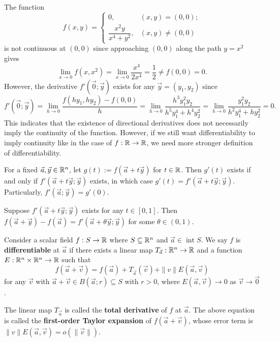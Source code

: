 \documentclass[a4paper]{ctexart}
\begin{document}
    \begin{myex}
        The function
        $$ f(x,y) = \begin{cases}
            0, & (x,y) = (0,0); \\[6pt]
            \dfrac{x^2 y}{x^4 + y^2}, & (x,y) \ne (0,0)
        \end{cases}
        $$
        is not continuous at $(0,0)$ since approaching $(0,0)$ along the path $y=x^2$ gives
        $$ \lim_{x\to 0} f(x,x^2) = \lim_{x\to 0} \frac{x^4}{2x^4} = \frac{1}{2} \ne f(0,0) = 0. $$
        However, the derivative $f'(\vec 0; \vec y)$ exists for any $\vec y = (y_1, y_2)$ since
        $$ f'(\vec 0; \vec y) = \lim_{h\to 0} \frac{f(h y_1, h y_2) - f(0,0)}{h} = \lim_{h\to 0} \frac{h^3 y_1^2 y_2}{h^5 y_1^4 + h^4 y_2^2} = \lim_{h\to 0} \frac{y_1^2 y_2}{h^2 y_1^4 + h y_2^2} = 0. $$
        This indicates that the existence of directional derivatives does not necessarily imply the continuity of the function. However, if we still want differentiability to imply continuity like in the case of $f:\mathbb{R} \to \mathbb{R}$, we need more stronger definition of differentiability.
            
    \end{myex}
    \begin{mythm}
        For a fixed $\vec a, \vec y \in \mathbb{R}^n$, let $g(t):= f(\vec a + t \vec y)$ for $t\in \mathbb{R}$. Then $g'(t)$ exists if and only if $f'(\vec a + t \vec y; \vec y)$ exists, in which case $g'(t) = f'(\vec a + t \vec y; \vec y)$. Particularly, $f'(\vec a; \vec y) = g'(0)$.
    \end{mythm}
    \begin{mythm}
        Suppose $f'(\vec a + t\vec y; \vec y)$ exists for any $t\in [0,1]$. Then $f(\vec a + \vec y) - f(\vec a) = f'(\vec a + \theta \vec y; \vec y)$ for some $\theta \in (0,1)$.
    \end{mythm}
    \begin{mydef}
        Consider a scalar field $f:S\to \mathbb{R}$ where $S\subseteq \mathbb{R}^n$ and $\vec a \in \operatorname{int} S$. We say $f$ is \textbf{differentiable} at $\vec a$ if there exists a linear map $T_{\vec a}:\mathbb{R}^n \to \mathbb{R}$ and a function $E:\mathbb{R}^n \times \mathbb{R}^n \to \mathbb{R}$ such that
        $$ f(\vec a + \vec v) = f(\vec a) + T_{\vec a}(\vec v) + \|v\|E(\vec a, \vec v) $$
        for any $\vec v$ with $\vec a + \vec v \in B(\vec a;r)\subseteq S$ with $r>0$, where $E(\vec a, \vec v) \to 0$ as $\vec v \to \vec 0$.

        The linear map $T_{\vec a}$ is called the \textbf{total derivative} of $f$ at $\vec a$. The above equation is called the \textbf{first-order Taylor expansion} of $f(\vec a+\vec v)$, whose error term is $\| v\|E(\vec a, \vec v)=o(\|\vec v\|)$.
    \end{mydef}
\end{document}
